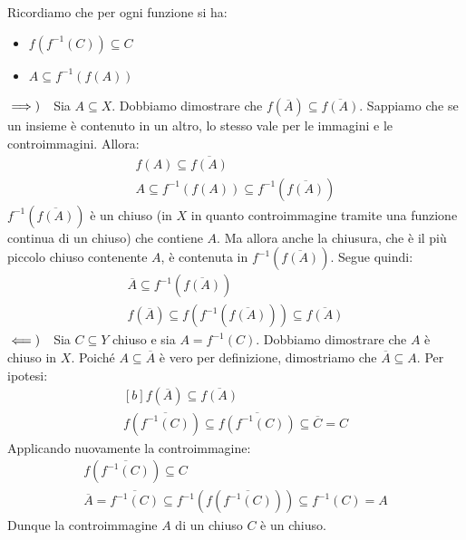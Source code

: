 \begin{demonstration}
Ricordiamo che per ogni funzione si ha:
\begin{itemize}
\item $f\left(f^{-1}\left(C\right)\right)\subseteq C$
\item $A\subseteq f^{-1}\left(f\left(A\right)\right)$
\end{itemize} 
$\implies)\quad$Sia $A\subseteq X$. Dobbiamo dimostrare che $f\left(\overline{A}\right)\subseteq\overline{f\left(A\right)}$. Sappiamo che se un insieme è contenuto in un altro, lo stesso vale per le immagini e le controimmagini. Allora:
\begin{gather*}
f\left(A\right)\subseteq \overline{f\left(A\right)}\\
A\subseteq f^{-1}\left(f\left(A\right)\right)\subseteq f^{-1}\left(\overline{f\left(A\right)}\right)
\end{gather*}
$f^{-1}\left(\overline{f\left(A\right)}\right)$ è un chiuso (in $X$ in quanto controimmagine tramite una funzione continua di un chiuso) che contiene $A$.
Ma allora anche la chiusura, che è il più piccolo chiuso contenente $A$, è contenuta in $f^{-1}\left(\overline{f\left(A\right)}\right)$. Segue quindi:
\begin{gather*}
	\overline{A}\subseteq f^{-1}\left(\overline{f\left(A\right)}\right)\\
	f\left(\overline{A}\right)\subseteq f\left(f^{-1}\left(\overline{f\left(A\right)}\right)\right)\subseteq\overline{f\left(A\right)}
\end{gather*}
$\impliedby)\quad$Sia $C\subseteq Y$ chiuso e sia $A=f^{-1}\left(C\right)$. Dobbiamo dimostrare che $A$ è chiuso in $X$.
Poiché $A\subseteq \overline{A}$ è vero per definizione, dimostriamo che $\overline{A}\subseteq A$. Per ipotesi:
\[
\begin{gathered}[b]
f\left(\overline{A}\right)\subseteq\overline{f\left(A\right)}\\
f\left(\overline{f^{-1}\left(C\right)}\right)\subseteq\overline{f\left(f^{-1}\left(C\right)\right)}\subseteq \overline{C}=C
\end{gathered}
\]
Applicando nuovamente la controimmagine:
\begin{gather*}
f\left(\overline{f^{-1}\left(C\right)}\right)\subseteq C\\
\overline{A}=\overline{f^{-1}\left(C\right)}\subseteq f^{-1}\left(f\left(\overline{f^{-1}\left(C\right)}\right)\right)\subseteq f^{-1}\left(C\right)=A
\end{gather*}
Dunque la controimmagine $A$ di un chiuso $C$ è un chiuso.
\end{demonstration}
